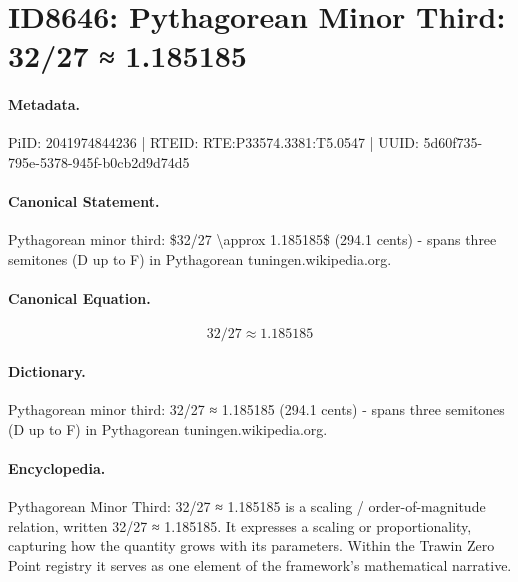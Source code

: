 \section*{ID8646: Pythagorean Minor Third: 32/27 ≈ 1.185185}
\paragraph{Metadata.}
PiID: 2041974844236 | RTEID: RTE:P33574.3381:T5.0547 | UUID: 5d60f735-795e-5378-945f-b0cb2d9d74d5

\paragraph{Canonical Statement.}
Pythagorean minor third: \$32/27 \textbackslash{}approx 1.185185\$ (294.1 cents) - spans three semitones (D up to F) in Pythagorean tuningen.wikipedia.org.

\paragraph{Canonical Equation.}
\[
32/27 \approx 1.185185
\]

\paragraph{Dictionary.}
Pythagorean minor third: 32/27 ≈ 1.185185 (294.1 cents) - spans three semitones (D up to F) in Pythagorean tuningen.wikipedia.org.

\paragraph{Encyclopedia.}
Pythagorean Minor Third: 32/27 ≈ 1.185185 is a scaling / order-of-magnitude relation, written 32/27 ≈ 1.185185. It expresses a scaling or proportionality, capturing how the quantity grows with its parameters. Within the Trawin Zero Point registry it serves as one element of the framework's mathematical narrative.
